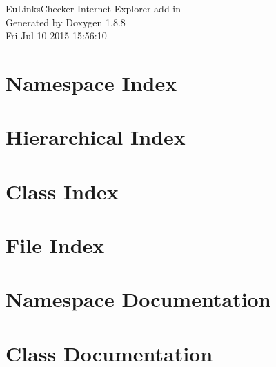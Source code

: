\documentclass[twoside]{book}
\newcommand{\+}{\discretionary{\mbox{\scriptsize$\hookleftarrow$}}{}{}}
\newcommand{\clearemptydoublepage}{%
  \newpage{\pagestyle{empty}\cleardoublepage}%
}
\begin{document}
\hypersetup{pageanchor=false,
             bookmarks=true,
             bookmarksnumbered=true,
             pdfencoding=unicode
            }
\begin{titlepage}
\vspace*{7cm}
\begin{center}%
{\Large Eu\+Links\+Checker Internet Explorer add-\/in }\\
\vspace*{1cm}
{\large Generated by Doxygen 1.8.8}\\
\vspace*{0.5cm}
{\small Fri Jul 10 2015 15:56:10}\\
\end{center}
\end{titlepage}
\clearemptydoublepage
\tableofcontents
\clearemptydoublepage
{}
\hypersetup{pageanchor=true}

\chapter{Namespace Index}

\chapter{Hierarchical Index}

\chapter{Class Index}

\chapter{File Index}

\chapter{Namespace Documentation}


\chapter{Class Documentation}

















\end{document}
